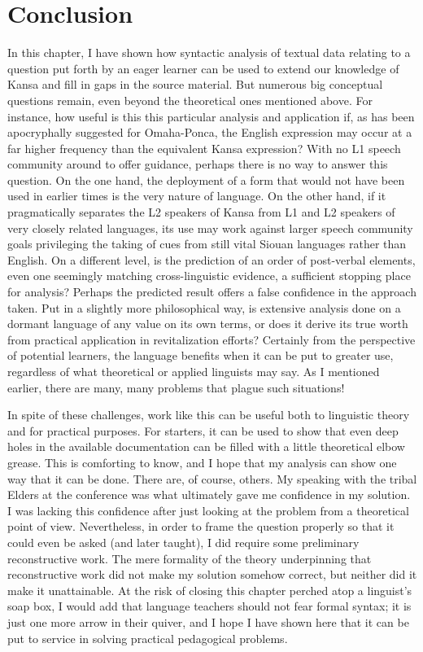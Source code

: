 \documentclass[output=paper]{LSP/langsci}
\begin{document}
\section{Conclusion}
	In this chapter, I have shown how syntactic analysis of textual data relating to a question put forth by an eager learner can be used to extend our knowledge of Kansa and fill in gaps in the source material. But numerous big conceptual questions remain, even beyond the theoretical ones mentioned above. For instance, how useful is this this particular analysis and application if, as has been apocryphally suggested for Omaha-Ponca, the English expression may occur at a far higher frequency than the equivalent Kansa expression? With no L1 speech community around to offer guidance, perhaps there is no way to answer this question. On the one hand, the deployment of a form that would not have been used in earlier times is the very nature of language. On the other hand, if it pragmatically separates the L2 speakers of Kansa from L1 and L2 speakers of very closely related languages, its use may work against larger speech community goals privileging the taking of cues from still vital Siouan languages rather than English. On a different level, is the prediction of an order of post-verbal elements, even one seemingly matching cross-linguistic evidence, a sufficient stopping place for analysis? Perhaps the predicted result offers a false confidence in the approach taken. Put in a slightly more philosophical way, is extensive analysis done on a dormant language of any value on its own terms, or does it derive its true worth from practical application in revitalization efforts? Certainly from the perspective of potential learners, the language benefits when it can be put to greater use, regardless of what theoretical or applied linguists may say. As I mentioned earlier, there are many, many problems that plague such situations!
	
	In spite of these challenges, work like this can be useful both to linguistic theory and for practical purposes. For starters, it can be used to show that even deep holes in the available documentation can be filled with a little theoretical elbow grease. This is comforting to know, and I hope that my analysis can show one way that it can be done. There are, of course, others. My speaking with the tribal Elders at the conference was what ultimately gave me confidence in my solution. I was lacking this confidence after just looking at the problem from a theoretical point of view. Nevertheless, in order to frame the question properly so that it could even be asked (and later taught), I did require some preliminary reconstructive work. The mere formality of the theory underpinning that reconstructive work did not make my solution somehow correct, but neither did it make it unattainable. At the risk of closing this chapter perched atop a linguist's soap box, I would add that language teachers should not fear formal syntax; it is just one more arrow in their quiver, and I hope I have shown here that it can be put to service in solving practical pedagogical problems.
\end{document}
